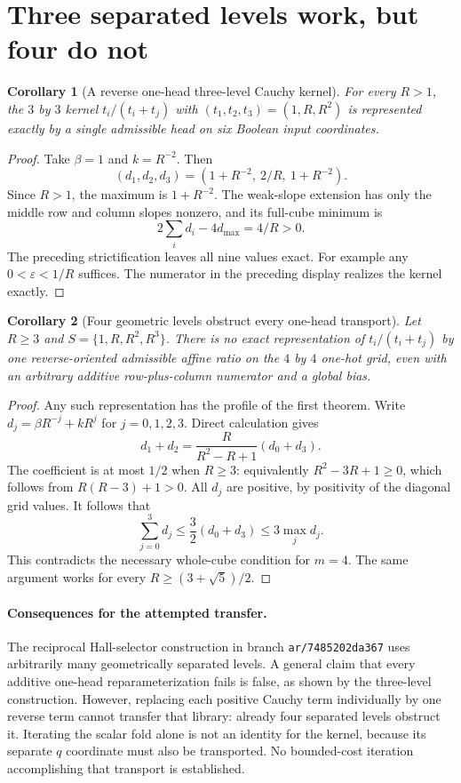 \documentclass[11pt]{article}
\newtheorem{corollary}{Corollary}
\begin{document}
\section{Three separated levels work, but four do not}

\begin{corollary}[A reverse one-head three-level Cauchy kernel]
For every $R>1$, the $3$ by $3$ kernel
$t_i/(t_i+t_j)$ with $(t_1,t_2,t_3)=(1,R,R^2)$ is represented exactly
by a single admissible head on six Boolean input coordinates.
\end{corollary}

\begin{proof}
Take $\beta=1$ and $k=R^{-2}$. Then
\[
 (d_1,d_2,d_3)=(1+R^{-2},\ 2/R,\ 1+R^{-2}).
\]
Since $R>1$, the maximum is $1+R^{-2}$. The weak-slope extension
has only the middle row and column slopes nonzero, and its full-cube
minimum is
\[
 2\sum_i d_i-4d_{\max}=4/R>0.
\]
The preceding strictification leaves all nine values exact. For
example any $0<\varepsilon<1/R$ suffices. The numerator in the
preceding display realizes the kernel exactly.
\end{proof}

\begin{corollary}[Four geometric levels obstruct every one-head transport]
Let $R\ge3$ and $S=\{1,R,R^2,R^3\}$. There is no exact
representation of $t_i/(t_i+t_j)$ by one reverse-oriented admissible
affine ratio on the $4$ by $4$ one-hot grid, even with an arbitrary
additive row-plus-column numerator and a global bias.
\end{corollary}

\begin{proof}
Any such representation has the profile of the first theorem. Write
$d_j=\beta R^{-j}+kR^j$ for $j=0,1,2,3$. Direct calculation gives
\[
 d_1+d_2=\frac{R}{R^2-R+1}(d_0+d_3).
\]
The coefficient is at most $1/2$ when $R\ge3$: equivalently
$R^2-3R+1\ge0$, which follows from $R(R-3)+1>0$.
All $d_j$ are positive, by positivity of the diagonal grid values.
It follows that
\[
 \sum_{j=0}^3 d_j
 \le\frac32(d_0+d_3)
 \le3\max_jd_j.
\]
This contradicts the necessary whole-cube condition for $m=4$.
The same argument works for every $R\ge(3+\sqrt5)/2$.
\end{proof}

\paragraph{Consequences for the attempted transfer.}
The reciprocal Hall-selector construction in branch
\texttt{ar/7485202da367} uses arbitrarily many geometrically separated
levels. A general claim that every additive one-head reparameterization
fails is false, as shown by the three-level construction. However,
replacing each positive Cauchy term individually by one reverse term
cannot transfer that library: already four separated levels obstruct
it. Iterating the scalar fold alone is not an identity for the kernel,
because its separate $q$ coordinate must also be transported. No
bounded-cost iteration accomplishing that transport is established.
\end{document}
